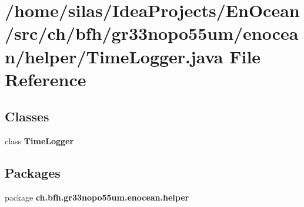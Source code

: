 \section{/home/silas/\+Idea\+Projects/\+En\+Ocean/src/ch/bfh/gr33nopo55um/enocean/helper/\+Time\+Logger.java File Reference}
\label{TimeLogger_8java}
\subsection*{Classes}
\begin{DoxyCompactItemize}
\item 
class {\bf Time\+Logger}
\end{DoxyCompactItemize}
\subsection*{Packages}
\begin{DoxyCompactItemize}
\item 
package {\bf ch.\+bfh.\+gr33nopo55um.\+enocean.\+helper}
\end{DoxyCompactItemize}
